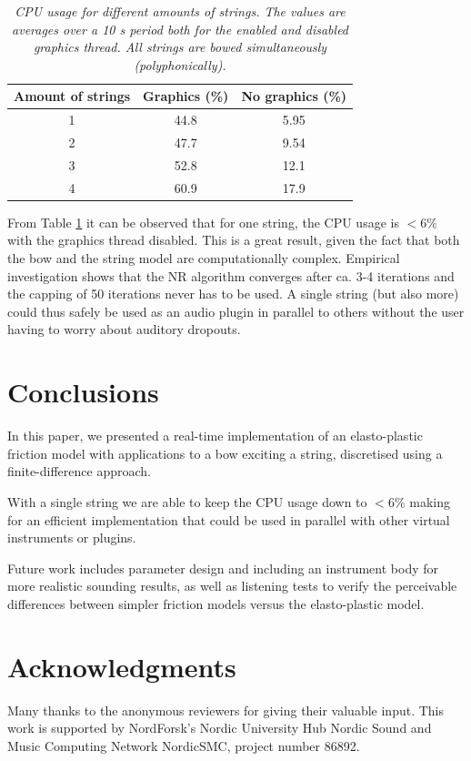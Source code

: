     \begin{table}[ht]
      \caption{{\it CPU usage for different amounts of strings. The values are averages over a 10 s period both for the enabled and disabled graphics thread. All strings are bowed simultaneously (polyphonically).}}
        \centering
      \begin{tabular}{|c|c|c|}\hline
       
        Amount of strings & Graphics (\%) & No graphics (\%)\\
        \hline
        1 & 44.8 & 5.95\\
        2 & 47.7 & 9.54\\
        3 & 52.8 & 12.1 \\
        4 & 60.9 & 17.9\\
        \hline
     \end{tabular}
      \label{tab:results}
    \end{table}
    
    From Table \ref{tab:results} it can be observed that for one string, the CPU usage is $<6\%$ with the graphics thread disabled. This is a great result, given the fact that both the bow and the string model are computationally complex. Empirical investigation shows that the NR algorithm converges after ca. 3-4 iterations and the capping of 50 iterations never has to be used. A single string (but also more) could thus safely be used as an audio plugin in parallel to others without the user having to worry about auditory dropouts. %
    
    \section{Conclusions}\label{sec:conclusion}
    In this paper, we presented a real-time implementation of an elasto-plastic friction model with applications to a  bow exciting a string, discretised using a finite-difference approach. 
    
    With a single string we are able to keep the CPU usage down to $<6\%$ making for an efficient implementation that could be used in parallel with other virtual instruments or plugins.
    
    Future work includes parameter design and including an instrument body for more realistic sounding results, as well as listening tests to verify the perceivable differences between simpler friction models versus the elasto-plastic model.
    
    
    
    \section{Acknowledgments}
    Many thanks to the anonymous reviewers for giving their valuable input. This work is supported by NordForsk's Nordic
    University Hub Nordic Sound and Music Computing Network
    NordicSMC, project number 86892.